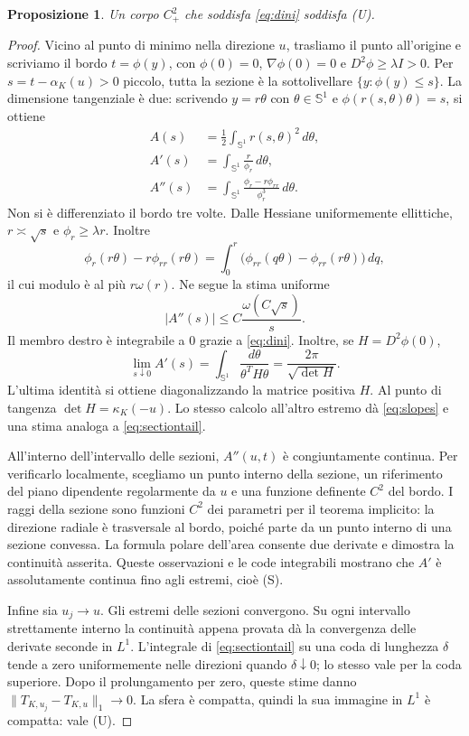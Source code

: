 \documentclass[11pt,a4paper]{article}
\newtheorem{proposition}[theorem]{Proposizione}
\theoremstyle{remark}
\begin{document}
\begin{proposition}\label{prop:dini}
Un corpo $C^2_+$ che soddisfa \eqref{eq:dini} soddisfa (U).
\end{proposition}
\begin{proof}
Vicino al punto di minimo nella direzione $u$, trasliamo il punto
all'origine e scriviamo il bordo $t=\phi(y)$, con
$\phi(0)=0$, $\nabla\phi(0)=0$ e $D^2\phi\geq\lambda I>0$.
Per $s=t-\alpha_K(u)>0$ piccolo, tutta la sezione è la sottolivellare
$\{y:\phi(y)\leq s\}$. La dimensione tangenziale è due: scrivendo
$y=r\theta$ con $\theta\in\mathbb S^1$ e
$\phi(r(s,\theta)\theta)=s$, si ottiene
\begin{align*}
A(s)&=\frac12\int_{\mathbb S^1}r(s,\theta)^2\,d\theta,\\
A'(s)&=\int_{\mathbb S^1}\frac r{\phi_r}\,d\theta,\\
A''(s)&=\int_{\mathbb S^1}
\frac{\phi_r-r\phi_{rr}}{\phi_r^3}\,d\theta.
\end{align*}
Non si è differenziato il bordo tre volte. Dalle Hessiane uniformemente
ellittiche, $r\asymp\sqrt{s}$ e $\phi_r\geq\lambda r$.
Inoltre
\[
\phi_r(r\theta)-r\phi_{rr}(r\theta)
=\int_0^r\bigl(\phi_{rr}(q\theta)-\phi_{rr}(r\theta)\bigr)\,dq,
\]
il cui modulo è al più $r\omega(r)$. Ne segue la stima uniforme
\begin{equation}\label{eq:sectiontail}
|A''(s)|\leq C\frac{\omega(C\sqrt{s})}{s}.
\end{equation}
Il membro destro è integrabile a $0$ grazie a \eqref{eq:dini}.
Inoltre, se $H=D^2\phi(0)$,
\[
\lim_{s\downarrow0}A'(s)
=\int_{\mathbb S^1}\frac{d\theta}{\theta^TH\theta}
=\frac{2\pi}{\sqrt{\det H}}.
\]
L'ultima identità si ottiene diagonalizzando la matrice positiva $H$.
Al punto di tangenza $\det H=\kappa_K(-u)$.
Lo stesso calcolo all'altro estremo dà \eqref{eq:slopes} e una stima
analoga a \eqref{eq:sectiontail}.

All'interno dell'intervallo delle sezioni, $A''(u,t)$ è congiuntamente
continua. Per verificarlo localmente, scegliamo un punto interno della
sezione, un riferimento del piano dipendente regolarmente da $u$ e una
funzione definente $C^2$ del bordo. I raggi della sezione sono funzioni
$C^2$ dei parametri per il teorema implicito: la direzione radiale è
trasversale al bordo, poiché parte da un punto interno di una sezione
convessa. La formula polare dell'area consente due derivate e dimostra
la continuità asserita. Queste osservazioni e le code integrabili mostrano
che $A'$ è assolutamente continua fino agli estremi, cioè (S).

Infine sia $u_j\to u$. Gli estremi delle sezioni convergono. Su ogni
intervallo strettamente interno la continuità appena provata dà la
convergenza delle derivate seconde in $L^1$. L'integrale di
\eqref{eq:sectiontail} su una coda di lunghezza $\delta$ tende a zero
uniformemente nelle direzioni quando $\delta\downarrow0$; lo stesso
vale per la coda superiore. Dopo il prolungamento per zero, queste
stime danno $\|T_{K,u_j}-T_{K,u}\|_1\to0$. La sfera è compatta, quindi
la sua immagine in $L^1$ è compatta: vale (U).
\end{proof}
\end{document}
